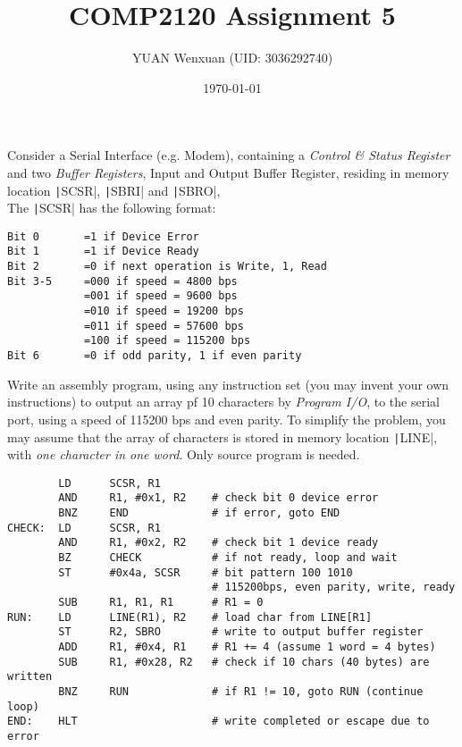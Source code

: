 \documentclass[answers]{exam}
\title{COMP2120 Assignment 5}
\author{YUAN Wenxuan (UID: 3036292740)}
\date{\today}
\begin{document}
\maketitle
\begin{questions}

    \question Consider a Serial Interface (e.g. Modem),
    containing a \textit{Control \& Status Register} and two \textit{Buffer Registers}, Input and Output Buffer Register,
    residing in memory location \texttt|SCSR|, \texttt|SBRI| and \texttt|SBRO|, \\
    The \texttt|SCSR| has the following format:

    \begin{verbatim}
Bit 0       =1 if Device Error
Bit 1       =1 if Device Ready
Bit 2       =0 if next operation is Write, 1, Read
Bit 3-5     =000 if speed = 4800 bps
            =001 if speed = 9600 bps
            =010 if speed = 19200 bps
            =011 if speed = 57600 bps
            =100 if speed = 115200 bps
Bit 6       =0 if odd parity, 1 if even parity
    \end{verbatim}

    Write an assembly program, using any instruction set (you may invent your own instructions) to output an array pf 10 characters by \textit{Program I/O}, to the serial port, using a speed of 115200 bps and even parity.
    To simplify the problem, you may assume that the array of characters is stored in memory location \texttt|LINE|, with \textit{one character in one word}.
    Only source program is needed.

    \begin{solution}
        \begin{verbatim}
        LD      SCSR, R1
        AND     R1, #0x1, R2    # check bit 0 device error
        BNZ     END             # if error, goto END
CHECK:  LD      SCSR, R1
        AND     R1, #0x2, R2    # check bit 1 device ready
        BZ      CHECK           # if not ready, loop and wait
        ST      #0x4a, SCSR     # bit pattern 100 1010
                                # 115200bps, even parity, write, ready
        SUB     R1, R1, R1      # R1 = 0
RUN:    LD      LINE(R1), R2    # load char from LINE[R1]
        ST      R2, SBRO        # write to output buffer register
        ADD     R1, #0x4, R1    # R1 += 4 (assume 1 word = 4 bytes)
        SUB     R1, #0x28, R2   # check if 10 chars (40 bytes) are written
        BNZ     RUN             # if R1 != 10, goto RUN (continue loop)
END:    HLT                     # write completed or escape due to error
        \end{verbatim}
    \end{solution}


\end{questions}
\end{document}
